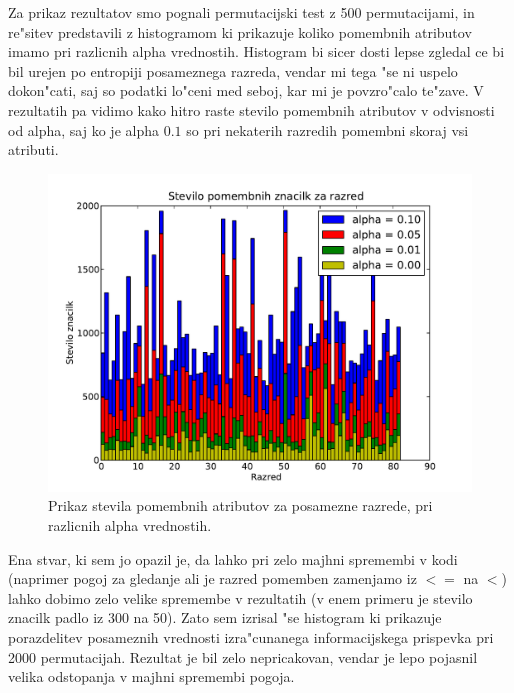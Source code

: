 \documentclass[a4paper,11pt]{article}
\begin{document}
Za prikaz rezultatov smo pognali permutacijski test z 500 permutacijami, in re"sitev predstavili z histogramom ki prikazuje koliko pomembnih atributov imamo pri razlicnih alpha vrednostih. Histogram bi sicer dosti lepse zgledal ce bi bil urejen po entropiji posameznega razreda, vendar mi tega "se ni uspelo dokon"cati, saj so podatki lo"ceni med seboj, kar mi je povzro"calo te"zave. V rezultatih pa vidimo kako hitro raste stevilo pomembnih atributov v odvisnosti od alpha, saj ko je alpha $0.1$ so pri nekaterih razredih pomembni skoraj vsi atributi. 
\begin{figure}[H]
\begin{center}
\includegraphics[scale=0.6]{muraw.pdf}
\caption{Prikaz stevila pomembnih atributov za posamezne razrede, pri razlicnih alpha vrednostih.}
\label{slika1}
\end{center}
\end{figure}

Ena stvar, ki sem jo opazil je, da lahko pri zelo majhni spremembi v kodi (naprimer pogoj za gledanje ali je razred pomemben zamenjamo iz $<=$ na $<$) lahko dobimo zelo velike spremembe v rezultatih (v enem primeru je stevilo znacilk padlo iz 300 na 50). Zato sem izrisal "se histogram ki prikazuje porazdelitev posameznih vrednosti izra"cunanega informacijskega prispevka pri 2000 permutacijah. Rezultat je bil zelo nepricakovan, vendar je lepo pojasnil velika odstopanja v majhni spremembi pogoja.
\end{document}

